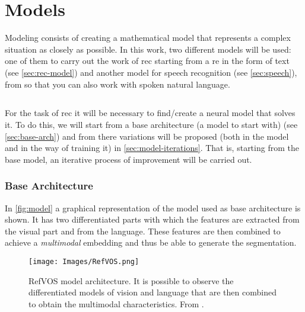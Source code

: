 

\chapter{Models}\label{cha:models}



\drop Modeling consists of creating a mathematical model that represents a
complex situation as closely as possible. In this work, two different models
will be used: one of them to carry out the work of \gls{rec} starting from a
\gls{re} in the form of text (see \vref{sec:rec-model}) and another model for
speech recognition (see \vref{sec:speech}), from so that you can also work with
spoken natural language.



\section{}\label{sec:rec-model}

For the task of \gls{rec} it will be necessary to find/create a neural model
that solves it. To do this, we will start from a base architecture (a model to
start with) (see \vref{sec:base-arch}) and from there variations will be
proposed (both in the model and in the way of training it) in
\vref{sec:model-iterations}. That is, starting from the base model, an
iterative process of improvement will be carried out.


\subsection{Base Architecture}\label{sec:base-arch}

In \vref{fig:model} a graphical representation of the model used as base
architecture is shown. It has two differentiated parts with which the features
are extracted from the visual part and from the language. These features are
then combined to achieve a \emph{multimodal} embedding and thus be able to
generate the segmentation.

\begin{figure}[ht]
  \centering
  \texttt{[image: Images/RefVOS.png]}
  \caption[RefVOS model architecture]{RefVOS model architecture. It is possible
    to observe the differentiated models of vision and language that are then
    combined to obtain the multimodal characteristics. From
    .}\label{fig:model}
\end{figure}

